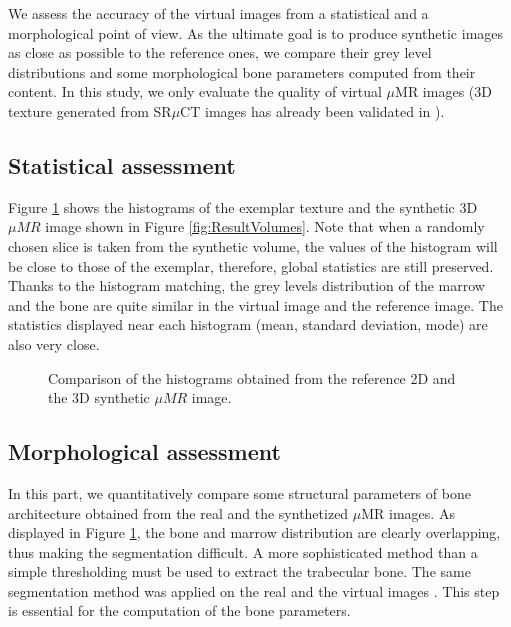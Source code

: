 We assess the accuracy of the virtual images from a statistical and a morphological point of view. As the ultimate goal is to produce synthetic images as close as possible 
to the reference ones, we compare their grey level distributions and some morphological bone parameters computed from their content. 
In this study, we only evaluate the quality of virtual $\mu$MR images (3D texture generated from SR$\mu$CT images has already been validated in  \cite{prieto2012}).


\subsection{Statistical assessment}
\label{sec:Statistics}

Figure \ref{fig:histograms} shows the histograms of the exemplar texture and the synthetic 3D $\mu{MR}$ 
image shown in Figure \ref{fig:ResultVolumes}. 
Note that when a randomly chosen slice is taken from the synthetic volume, the values of the histogram will be close to those of the exemplar,
therefore, global statistics are still preserved. 
Thanks to the histogram matching, 
the grey levels distribution of the marrow and the bone are quite similar in the virtual image and the reference image. 
The statistics displayed near each histogram (mean, standard deviation, mode) are also very close.

\begin{figure}
 \centering 
\caption{Comparison of the histograms obtained from the reference 2D and the 3D synthetic $\mu{MR}$ image.}
 \label{fig:histograms}
\end{figure}

\subsection{Morphological assessment}
\label{sec:Morphology}
\noindent
In this part, we quantitatively compare some structural parameters of bone architecture obtained from the real and the synthetized $\mu$MR images.
As displayed in Figure \ref{fig:histograms}, the bone and marrow distribution are clearly overlapping, thus making the segmentation difficult. A more sophisticated method than a simple thresholding must be used to extract the trabecular bone. The same segmentation method was applied on the real and the virtual images \cite{PR2002}. This step is essential for the computation of the bone parameters.  %

